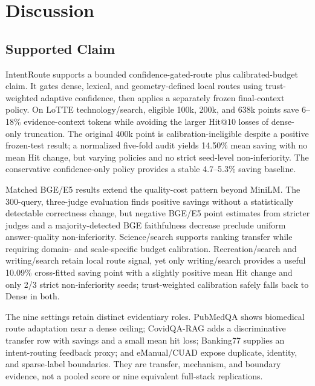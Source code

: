 
\section{Discussion}
\label{sec:07-discussion:discussion}

\subsection{Supported Claim}
\label{sec:07-discussion:supported-claim}

IntentRoute supports a bounded confidence-gated-route plus calibrated-budget claim. It gates dense, lexical, and geometry-defined local routes using trust-weighted adaptive confidence, then applies a separately frozen final-context policy. On LoTTE technology/search, eligible 100k, 200k, and 638k points save 6--18\% evidence-context tokens while avoiding the larger $\mathrm{Hit@10}$ losses of dense-only truncation. The original 400k point is calibration-ineligible despite a positive frozen-test result; a normalized five-fold audit yields 14.50\% mean saving with no mean Hit change, but varying policies and no strict seed-level non-inferiority. The conservative confidence-only policy provides a stable 4.7--5.3\% saving baseline.

Matched BGE/E5 results extend the quality-cost pattern beyond MiniLM. The 300-query, three-judge evaluation finds positive savings without a statistically detectable correctness change, but negative BGE/E5 point estimates from stricter judges and a majority-detected BGE faithfulness decrease preclude uniform answer-quality non-inferiority. Science/search supports ranking transfer while requiring domain- and scale-specific budget calibration. Recreation/search and writing/search retain local route signal, yet only writing/search provides a useful 10.09\% cross-fitted saving point with a slightly positive mean Hit change and only 2/3 strict non-inferiority seeds; trust-weighted calibration safely falls back to Dense in both.

The nine settings retain distinct evidentiary roles. PubMedQA shows biomedical route adaptation near a dense ceiling; CovidQA-RAG adds a discriminative transfer row with savings and a small mean hit loss; Banking77 supplies an intent-routing feedback proxy; and eManual/CUAD expose duplicate, identity, and sparse-label boundaries. They are transfer, mechanism, and boundary evidence, not a pooled score or nine equivalent full-stack replications.

